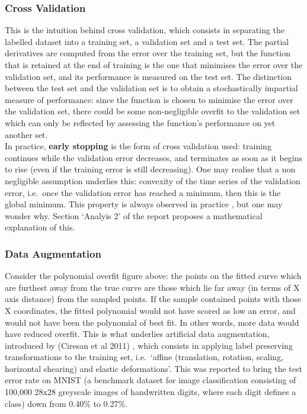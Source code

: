 \documentclass[a4paper,11pt]{article}
\begin{document}
\subsubsection{Cross Validation}

This is the intuition behind cross validation, which consists in separating the labelled dataset into a training set, a validation set and a test set. The partial derivatives are computed from the error over the training set, but the function that is retained at the end of training is the one that minimises the error over the validation set, and its performance is measured on the test set. The distinction between the test set and the validation set is to obtain a stochastically impartial measure of performance: since the function is chosen to minimise the error over the validation set, there could be some non-negligible overfit to the validation set which can only be reflected by assessing the function's performance on yet another set. \\

In practice, \textbf{early stopping} is the form of cross validation used: training continues while the validation error decreases, and terminates as soon as it begins to rise (even if the training error is still decreasing). One may realise that a non negligible assumption underlies this: convexity of the time series of the validation error, i.e.\ once the validation error has reached a minimum, then this is the global minimum. This property is always observed in practice \cite{ML-book}, but one may wonder why. Section `Analyis 2' of the report proposes a mathematical explanation of this. \\

\subsubsection{Data Augmentation}

Consider the polynomial overfit figure above: the points on the fitted curve which are furthest away from the true curve are those which lie far away (in terms of X axis distance) from the sampled points. If the sample contained points with those X coordinates, the fitted polynomial would not have scored as low an error, and would not have been the polynomial of best fit. In other words, more data would have reduced overfit. This is what underlies artificial data augmentation, introduced by (Ciresan et al 2011) \cite{data-aug}, which consists in applying label preserving transformations to the training set, i.e.\ `affine (translation, rotation, scaling, horizontal shearing) and elastic deformations'. This was reported to bring the test error rate on MNIST (a benchmark dataset for image classification consisting of 100,000 28x28 greyscale images of handwritten digits, where each digit defines a class) down from 0.40\% to 0.27\%. \\
\end{document}
